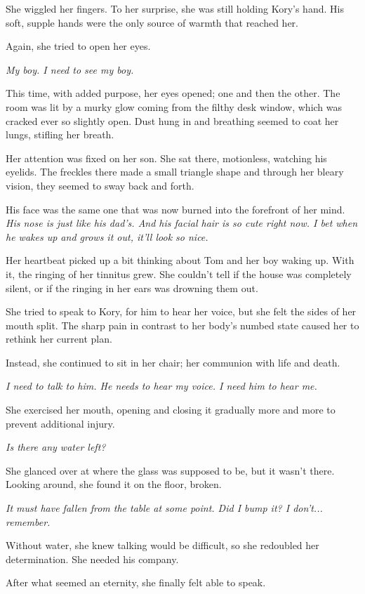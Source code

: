 She wiggled her fingers. To her surprise, she was still holding Kory's hand. His soft, supple hands were the only source of warmth that reached her.

Again, she tried to open her eyes.

\textit{My boy. I need to see my boy.}

This time, with added purpose, her eyes opened; one and then the other. The room was lit by a murky glow coming from the filthy desk window, which was cracked ever so slightly open. Dust hung in and breathing seemed to coat her lungs, stifling her breath.

Her attention was fixed on her son. She sat there, motionless, watching his eyelids. The freckles there made a small triangle shape and through her bleary vision, they seemed to sway back and forth.

His face was the same one that was now burned into the forefront of her mind. \textit{His nose is just like his dad's. And his facial hair is so cute right now. I bet when he wakes up and grows it out, it'll look so nice.}

Her heartbeat picked up a bit thinking about Tom and her boy waking up. With it, the ringing of her tinnitus grew. She couldn't tell if the house was completely silent, or if the ringing in her ears was drowning them out.

She tried to speak to Kory, for him to hear her voice, but she felt the sides of her mouth split. The sharp pain in contrast to her body's numbed state caused her to rethink her current plan.

Instead, she continued to sit in her chair; her communion with life and death.

\textit{I need to talk to him. He needs to hear my voice. I need him to hear me.}

She exercised her mouth, opening and closing it gradually more and more to prevent additional injury.

\textit{Is there any water left?}

She glanced over at where the glass was supposed to be, but it wasn't there. Looking around, she found it on the floor, broken.

\textit{It must have fallen from the table at some point. Did I bump it? I don't... remember.}

Without water, she knew talking would be difficult, so she redoubled her determination. She needed his company.

After what seemed an eternity, she finally felt able to speak.

